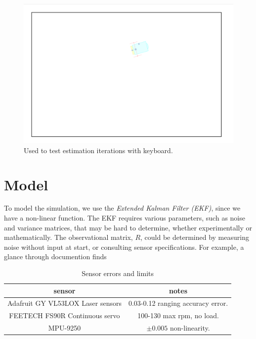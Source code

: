 \documentclass[11pt]{article}
\begin{document}
\begin{figure}[H]
	\includegraphics[width=\linewidth]{fig1a.png}
	\caption{Used to test estimation iterations with keyboard.}
	\label{fig:uisim}
\end{figure}

\section{Model}

To model the simulation, we use the \emph{Extended Kalman Filter (EKF)}, since we have a non-linear function. The EKF requires various parameters, such as noise and variance matrices, that may be hard to determine, whether experimentally or mathematically. The observational matrix, $R$, could be determined by measuring noise without input at start, or consulting sensor specifications. For example, a glance through documention finds

 \begin{table}[H]
	\begin{tabular}{|c|c|}
		
		\hline
		sensor & notes \\
		\hline\hline
		Adafruit GY VL53LOX Laser sensors & 0.03-0.12 ranging accuracy error. \\ \hline
		FEETECH FS90R Continuous servo & 100-130 max rpm, no load. \\ \hline
		MPU-9250 & $\pm 0.005$ non-linearity. \\
		\hline
		
	\end{tabular}
	\caption{Sensor errors and limits}\label{table:errlim}
\end{table}
\end{document}
